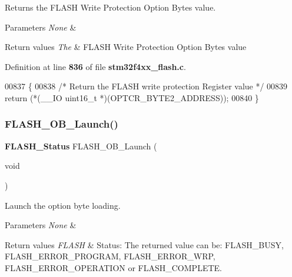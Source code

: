 Returns the F\+L\+A\+SH Write Protection Option Bytes value. 


\begin{DoxyParams}{Parameters}
{\em None} & \\
\hline
\end{DoxyParams}

\begin{DoxyRetVals}{Return values}
{\em The} & F\+L\+A\+SH Write Protection Option Bytes value \\
\hline
\end{DoxyRetVals}


Definition at line \textbf{ 836} of file \textbf{ stm32f4xx\+\_\+flash.\+c}.


\begin{DoxyCode}
00837 \{
00838   \textcolor{comment}{/* Return the FLASH write protection Register value */}
00839   \textcolor{keywordflow}{return} (*(\_\_IO uint16\_t *)(OPTCR_BYTE2_ADDRESS));
00840 \}
\end{DoxyCode}
\mbox{\label{group__FLASH__Group3_gabcbd44a62a2488d8b90aa8562a258ef1}} 
\subsubsection{F\+L\+A\+S\+H\+\_\+\+O\+B\+\_\+\+Launch()}
{\footnotesize\ttfamily \textbf{ F\+L\+A\+S\+H\+\_\+\+Status} F\+L\+A\+S\+H\+\_\+\+O\+B\+\_\+\+Launch (\begin{DoxyParamCaption}\item[{void}]{ }\end{DoxyParamCaption})}



Launch the option byte loading. 


\begin{DoxyParams}{Parameters}
{\em None} & \\
\hline
\end{DoxyParams}

\begin{DoxyRetVals}{Return values}
{\em F\+L\+A\+SH} & Status\+: The returned value can be\+: F\+L\+A\+S\+H\+\_\+\+B\+U\+SY, F\+L\+A\+S\+H\+\_\+\+E\+R\+R\+O\+R\+\_\+\+P\+R\+O\+G\+R\+AM, F\+L\+A\+S\+H\+\_\+\+E\+R\+R\+O\+R\+\_\+\+W\+RP, F\+L\+A\+S\+H\+\_\+\+E\+R\+R\+O\+R\+\_\+\+O\+P\+E\+R\+A\+T\+I\+ON or F\+L\+A\+S\+H\+\_\+\+C\+O\+M\+P\+L\+E\+TE. \\
\hline
\end{DoxyRetVals}


